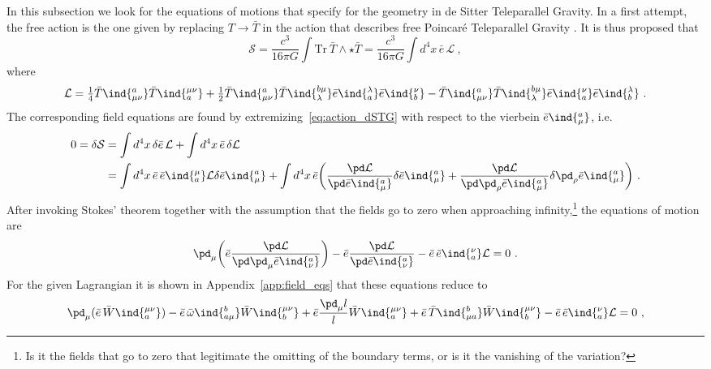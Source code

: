 \documentclass[11pt]{article}
\begin{document}
In this subsection we look for the equations of motions that 
specify for the geometry in de Sitter Teleparallel Gravity.  In a 
first attempt, the free action is the one given by replacing $T 
\to \bar{T}$ in the action that describes free Poincar\'e 
Teleparallel Gravity {\blu [Citations]}. It is thus proposed that  
\begin{equation}
	\label{eq:action_dSTG}
	\mathcal{S} = \frac{c^3}{16\pi G} \int \mathrm{Tr}~ \bar{T} 
	\wedge \star \bar{T} = \frac{c^3}{16\pi G} \int d^4 x \, 
	\bar{e}\, \mathcal{L}~,
\end{equation}
where
\begin{equation}
	\label{eq:lagrangian_dSTG}
	\mathcal{L} = \tfrac{1}{4} \bar{T}\ind{^a_{\mu\nu}} 
	\bar{T}\ind{_a^{\mu\nu}} + \tfrac{1}{2} 
	\bar{T}\ind{^a_{\mu\nu}} \bar{T}\ind{^{b\mu}_\lambda} 
	\bar{e}\ind{_a^\lambda} \bar{e}\ind{_b^\nu} - 
	\bar{T}\ind{^a_{\mu\nu}} \bar{T}\ind{^{b\mu}_\lambda} 
	\bar{e}\ind{_a^\nu} \bar{e}\ind{_b^\lambda}~.
\end{equation}
The corresponding field equations are found by 
extremizing~\eqref{eq:action_dSTG} with respect to the vierbein 
$\bar{e}\ind{^a_\mu}$, i.e.~
\begin{displaymath}
\begin{split}
	0 = \delta\mathcal{S} &= \int d^4x \, \delta\bar{e} \,
	\mathcal{L} + \int d^4x \, \bar{e} \, \delta\mathcal{L} \\
	&= \int d^4x \, \bar{e} \, \bar{e}\ind{_a^\mu} \mathcal{L} 
	\delta\bar{e}\ind{^a_\mu} + \int d^4x \, \bar{e} \bigg( 
	\frac{\pd \mathcal{L}}{\pd \bar{e}\ind{^a_\mu}} \delta 
	\bar{e}\ind{^a_\mu} + \frac{\pd \mathcal{L}}{\pd \pd_\rho 
		\bar{e}\ind{^a_\mu}} \delta \pd_\rho \bar{e}\ind{^a_\mu} 
	\bigg)~.
\end{split}
\end{displaymath}
After invoking Stokes' theorem together with the assumption that 
the fields go to zero when approaching infinity,\footnote{{\blu 
		Is it the fields that go to zero that legitimate the 
		omitting of the boundary terms, or is it the vanishing of 
		the variation?}} the equations of motion are
\begin{equation}
	\pd_\mu \bigg( \bar{e} \frac{\pd \mathcal{L}}{\pd \pd_\mu 
		\bar{e}\ind{^a_\nu}} \bigg) - \bar{e} \frac{\pd 
		\mathcal{L}}{\pd \bar{e}\ind{^a_\nu}} - \bar{e}\, 
	\bar{e}\ind{_a^\nu} \mathcal{L} = 0~.
\end{equation}
For the given Lagrangian it is shown in 
Appendix~\ref{app:field_eqs} that these equations reduce to
\begin{displaymath}
	\pd_\mu (\bar{e}\, \bar{W}\ind{_a^{\mu\nu}}) - \bar{e}\, 
	\bar{\omega}\ind{^b_{a\mu}} \bar{W}\ind{_b^{\mu\nu}} + \bar{e} 
	\frac{\pd_\mu l}{l} \bar{W}\ind{_a^{\mu\nu}} + \bar{e}\, 
	\bar{T}\ind{^b_{\mu a}} \bar{W}\ind{_b^{\mu\nu}} - \bar{e}\, 
	\bar{e}\ind{_a^\nu} \mathcal{L} = 0~,
\end{displaymath}
\end{document}
